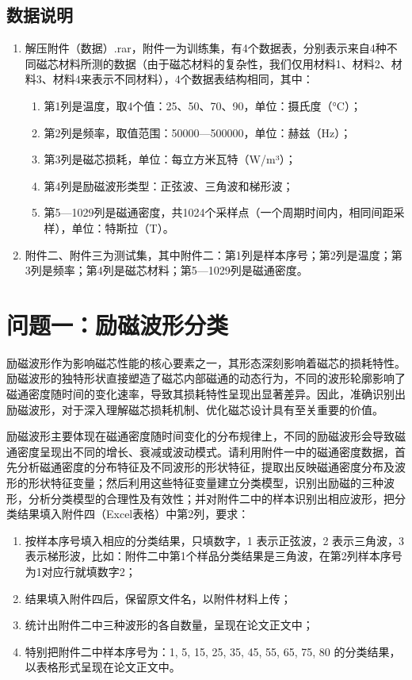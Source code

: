 \documentclass[a4paper,12pt]{ctexart}
\begin{document}
\subsection{数据说明}

\begin{enumerate}
    \item 解压附件（数据）.rar，附件一为训练集，有4个数据表，分别表示来自4种不同磁芯材料所测的数据（由于磁芯材料的复杂性，我们仅用材料1、材料2、材料3、材料4来表示不同材料），4个数据表结构相同，其中：
    \begin{enumerate}
        \item 第1列是温度，取4个值：25、50、70、90，单位：摄氏度（°C）；
        \item 第2列是频率，取值范围：50000—500000，单位：赫兹（Hz）；
        \item 第3列是磁芯损耗，单位：每立方米瓦特（W/m³）；
        \item 第4列是励磁波形类型：正弦波、三角波和梯形波；
        \item 第5—1029列是磁通密度，共1024个采样点（一个周期时间内，相同间距采样），单位：特斯拉（T）。
    \end{enumerate}
    \item 附件二、附件三为测试集，其中附件二：第1列是样本序号；第2列是温度；第3列是频率；第4列是磁芯材料；第5—1029列是磁通密度。
\end{enumerate}

\section{问题一：励磁波形分类}

励磁波形作为影响磁芯性能的核心要素之一，其形态深刻影响着磁芯的损耗特性。励磁波形的独特形状直接塑造了磁芯内部磁通的动态行为，不同的波形轮廓影响了磁通密度随时间的变化速率，导致其损耗特性呈现出显著差异。因此，准确识别出励磁波形，对于深入理解磁芯损耗机制、优化磁芯设计具有至关重要的价值。

励磁波形主要体现在磁通密度随时间变化的分布规律上，不同的励磁波形会导致磁通密度呈现出不同的增长、衰减或波动模式。请利用附件一中的磁通密度数据，首先分析磁通密度的分布特征及不同波形的形状特征，提取出反映磁通密度分布及波形的形状特征变量；然后利用这些特征变量建立分类模型，识别出励磁的三种波形，分析分类模型的合理性及有效性；并对附件二中的样本识别出相应波形，把分类结果填入附件四（Excel表格）中第2列，要求：

\begin{enumerate}
    \item 按样本序号填入相应的分类结果，只填数字，1 表示正弦波，2 表示三角波，3 表示梯形波，比如：附件二中第1个样品分类结果是三角波，在第2列样本序号为1对应行就填数字2；
    \item 结果填入附件四后，保留原文件名，以附件材料上传；
    \item 统计出附件二中三种波形的各自数量，呈现在论文正文中；
    \item 特别把附件二中样本序号为：1, 5, 15, 25, 35, 45, 55, 65, 75, 80 的分类结果，以表格形式呈现在论文正文中。
\end{enumerate}
\end{document}

